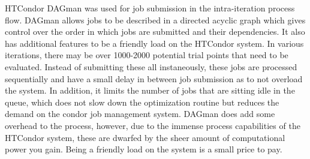 HTCondor DAGman was used for job submission in the intra-iteration process flow.  DAGman allows jobs to be described in a directed acyclic graph which gives control over the order in which jobs are submitted and their dependencies.  It also has additional features to be a friendly load on the HTCondor system.  In various iterations, there may be over 1000-2000 potential trial points that need to be evaluated.  Instead of submitting these all instaneously, these jobs are processed sequentially and have a small delay in between job submission as to not overload the system.  In addition, it limits the number of jobs that are sitting idle in the queue, which does not slow down the optimization routine but reduces the demand on the condor job management system.  DAGman does add some overhead to the process, however, due to the immense process capabilities of the HTCondor system, these are dwarfed by the sheer amount of computational power you gain.  Being a friendly load on the system is a small price to pay.

